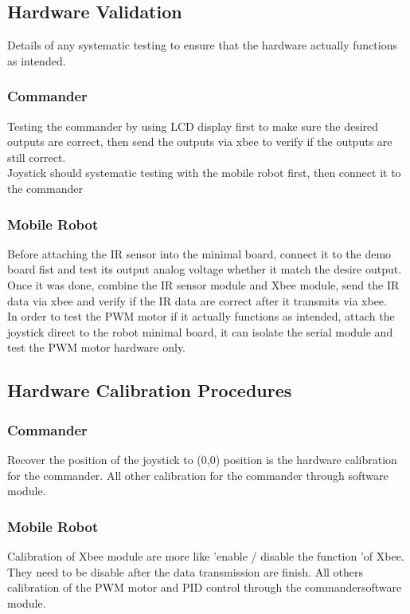 \documentclass[11pt,a4paper]{article}
\begin{document}
  \subsection{Hardware Validation}
  Details of any systematic testing to ensure that the hardware actually functions as intended.
    \subsubsection{Commander}
    Testing the commander by using LCD display first to make sure the desired outputs are correct, then send the outputs via xbee to verify if the outputs are still correct. \\
    Joystick should systematic testing with the mobile robot first, then connect it to the commander\\
    \subsubsection{Mobile Robot}
    Before attaching the IR sensor into the minimal board, connect it to the demo board fist and test its output analog  voltage whether it match the desire output. Once it was done, combine the IR sensor module and Xbee module, send the IR data via xbee and verify if the IR data are correct after it transmits via xbee.\\
    In order to test the PWM motor if it actually functions as intended, attach the joystick direct to the robot minimal board, it can isolate the serial module and test the PWM motor hardware only. \\

  \subsection{Hardware Calibration Procedures}
    \subsubsection{Commander}
    Recover the position of the joystick to (0,0) position is the hardware calibration for the commander. All other calibration for the commander through software module.
    \subsubsection{Mobile Robot}
    Calibration of Xbee module are more like 'enable / disable the function 'of Xbee. They need to be disable after the data transmission are finish. All others calibration of the PWM motor and PID control through the commandersoftware module.
\end{document}
